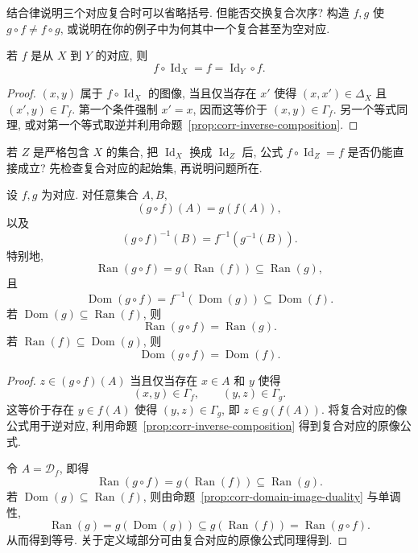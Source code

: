 \documentclass[usesamecnt, thmcnt=section, lang=cn, newtx, 10pt, scheme=chinese]{elegantbook}
\begin{document}
\begin{exercise}\label{ex:corr-associativity}
结合律说明三个对应复合时可以省略括号. 但能否交换复合次序? 构造 $f,g$ 使 $g\circ f\neq f\circ g$, 或说明在你的例子中为何其中一个复合甚至为空对应.
\end{exercise}

\begin{proposition}\label{prop:corr-identity-composition}
若 $f$ 是从 $X$ 到 $Y$ 的对应, 则
\[
 f\circ\operatorname{Id}_X=f
 =\operatorname{Id}_Y\circ f.
\]
\end{proposition}

\begin{proof}
$(x,y)$ 属于 $f\circ\operatorname{Id}_X$ 的图像, 当且仅当存在 $x'$ 使得 $(x,x')\in\Delta_X$ 且 $(x',y)\in\Gamma_f$. 第一个条件强制 $x'=x$, 因而这等价于 $(x,y)\in\Gamma_f$. 另一个等式同理, 或对第一个等式取逆并利用命题~\ref{prop:corr-inverse-composition}.
\end{proof}

\begin{exercise}\label{ex:corr-identity-composition}
若 $Z$ 是严格包含 $X$ 的集合, 把 $\operatorname{Id}_X$ 换成 $\operatorname{Id}_Z$ 后, 公式 $f\circ\operatorname{Id}_Z=f$ 是否仍能直接成立? 先检查复合对应的起始集, 再说明问题所在.
\end{exercise}

\begin{proposition}\label{prop:corr-composition-image}
设 $f,g$ 为对应. 对任意集合 $A,B$,
\[
 (g\circ f)(A)=g(f(A)),
\]
以及
\[
 (g\circ f)^{-1}(B)=f^{-1}(g^{-1}(B)).
\]
特别地,
\[
 \operatorname{Ran}(g\circ f)=g(\operatorname{Ran}(f))\subseteq\operatorname{Ran}(g),
\]
且
\[
 \operatorname{Dom}(g\circ f)=f^{-1}(\operatorname{Dom}(g))\subseteq\operatorname{Dom}(f).
\]
若 $\operatorname{Dom}(g)\subseteq\operatorname{Ran}(f)$, 则
\[
 \operatorname{Ran}(g\circ f)=\operatorname{Ran}(g).
\]
若 $\operatorname{Ran}(f)\subseteq\operatorname{Dom}(g)$, 则
\[
 \operatorname{Dom}(g\circ f)=\operatorname{Dom}(f).
\]
\end{proposition}

\begin{proof}
$z\in(g\circ f)(A)$ 当且仅当存在 $x\in A$ 和 $y$ 使得
\[
 (x,y)\in\Gamma_f,
 \qquad
 (y,z)\in\Gamma_g.
\]
这等价于存在 $y\in f(A)$ 使得 $(y,z)\in\Gamma_g$, 即 $z\in g(f(A))$. 将复合对应的像公式用于逆对应, 利用命题~\ref{prop:corr-inverse-composition} 得到复合对应的原像公式.

令 $A=\mathscr D_f$, 即得
\[
 \operatorname{Ran}(g\circ f)=g(\operatorname{Ran}(f))\subseteq\operatorname{Ran}(g).
\]
若 $\operatorname{Dom}(g)\subseteq\operatorname{Ran}(f)$, 则由命题~\ref{prop:corr-domain-image-duality} 与单调性,
\[
 \operatorname{Ran}(g)=g(\operatorname{Dom}(g))
 \subseteq g(\operatorname{Ran}(f))
 =\operatorname{Ran}(g\circ f).
\]
从而得到等号. 关于定义域部分可由复合对应的原像公式同理得到.
\end{proof}
\end{document}
